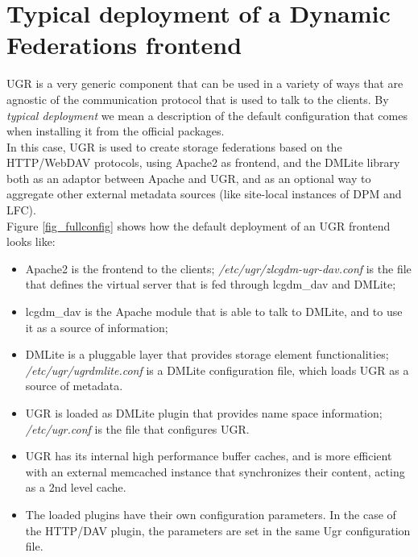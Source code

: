 \documentclass[12pt]{article} %
\begin{document}
\section{Typical deployment of a Dynamic Federations frontend}

UGR is a very generic component that can be used in a variety of ways that are agnostic of the communication protocol that is used to talk to the clients. By \textit{typical deployment} we mean a description of the default configuration that comes when installing it from the official packages.\\
In this case, UGR is used to create storage federations based on the HTTP/WebDAV protocols, using Apache2 as frontend, and the DMLite library both as an adaptor between Apache and UGR, and as an optional way to aggregate other external metadata sources (like site-local instances of DPM and LFC).\\
Figure \ref{fig_fullconfig} shows how the default deployment of an UGR frontend looks like:

\begin{itemize}

	\item Apache2 is the frontend to the clients;
	\subitem \textit{/etc/ugr/zlcgdm-ugr-dav.conf} is the file that defines the virtual server that is fed through lcgdm\_dav and DMLite;
	\item lcgdm\_dav is the Apache module that is able to talk to DMLite, and to use it as a source of information;
	\item DMLite is a pluggable layer that provides storage element functionalities;
	\subitem \textit{/etc/ugr/ugrdmlite.conf} is a DMLite configuration file, which loads UGR as a source of metadata.
	\item UGR is loaded as DMLite plugin that provides name space information;
	\subitem \textit{/etc/ugr.conf} is the file that configures UGR.
	\item UGR has its internal high performance buffer caches, and is more efficient with an external memcached instance that synchronizes their content, acting as a 2nd level cache.
	\item The loaded plugins have their own configuration parameters. In the case of the HTTP/DAV plugin, the parameters are set in the same Ugr configuration file.
	
\end{itemize}
\end{document}
